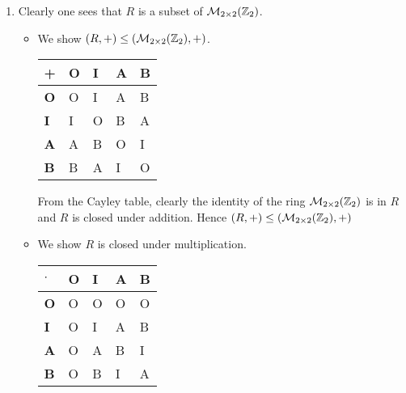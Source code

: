 \begin{enumerate}
    \begin{enumerate}[label=(\roman*)]
        \item Clearly one sees that $R$ is a subset of $\mathcal{M}_{2\times2}(\mathbb{Z}_{2})$.
        \begin{itemize}
            \item We show $(R, +)\leq(\mathcal{M}_{2\times2}(\mathbb{Z}_{2}),+)$.
            \begin{table}[h]
                \centering
                \begin{tabular}{|l|l|l|l|l|}
                    \hline
                    \textbf{+} & \textbf{O} & \textbf{I} & \textbf{A} & \textbf{B} \\ \hline
                    \textbf{O} & O          & I          & A          & B          \\ \hline
                    \textbf{I} & I          & O          & B          & A          \\ \hline
                    \textbf{A} & A          & B          & O          & I          \\ \hline
                    \textbf{B} & B          & A          & I          & O          \\ \hline
                \end{tabular}
            \end{table}
            
            From the Cayley table, clearly the identity of the ring $\mathcal{M}_{2\times2}(\mathbb{Z}_{2})$ is in $R$ and $R$ is closed under addition. Hence $(R, +)\leq(\mathcal{M}_{2\times2}(\mathbb{Z}_{2}),+)$

            \item We show $R$ is closed under multiplication.
            \begin{table}[h]
                \centering
                \begin{tabular}{|l|l|l|l|l|}
                    \hline
                    $\boldsymbol{\cdot}$ & \textbf{O} & \textbf{I} & \textbf{A} & \textbf{B} \\ \hline
                    \textbf{O}           & O          & O          & O          & O          \\ \hline
                    \textbf{I}           & O          & I          & A          & B          \\ \hline
                    \textbf{A}           & O          & A          & B          & I          \\ \hline
                    \textbf{B}           & O          & B          & I          & A          \\ \hline
                \end{tabular}
            \end{table}
            

\end{itemize}
\end{enumerate}
\end{enumerate}
